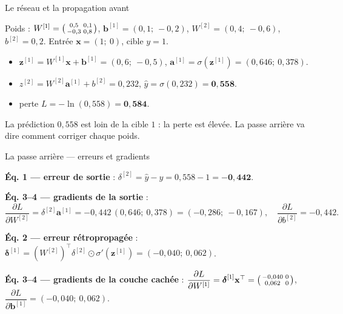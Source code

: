 \documentclass[aspectratio=169,11pt]{beamer}
\newcommand{\vx}{\mathbf{x}}
\newcommand{\va}{\mathbf{a}}
\newcommand{\vz}{\mathbf{z}}
\newcommand{\vb}{\mathbf{b}}
\newcommand{\vd}{\boldsymbol{\delta}}
\begin{document}
\begin{frame}{Le réseau et la propagation avant}
\begin{ucadex}
{\small Poids : $W^{[1]} = \begin{psmallmatrix} 0{,}5 & 0{,}1\\ -0{,}3 & 0{,}8 \end{psmallmatrix}$, $\vb^{[1]} = (0{,}1;\ -0{,}2)$, $W^{[2]} = (0{,}4;\ -0{,}6)$, $b^{[2]} = 0{,}2$. Entrée $\vx = (1;\ 0)$, cible $y = 1$.
\begin{itemize}
  \item $\vz^{[1]} = W^{[1]}\vx + \vb^{[1]} = (0{,}6;\ -0{,}5)$, \quad $\va^{[1]} = \sigma(\vz^{[1]}) = (0{,}646;\ 0{,}378)$.
  \item $z^{[2]} = W^{[2]}\va^{[1]} + b^{[2]} = 0{,}232$, \quad $\hat y = \sigma(0{,}232) = \mathbf{0{,}558}$.
  \item perte $L = -\ln(0{,}558) = \mathbf{0{,}584}$.
\end{itemize}
La prédiction $0{,}558$ est loin de la cible $1$ : la perte est élevée. La passe arrière va dire comment corriger chaque poids.}
\end{ucadex}
\end{frame}

\begin{frame}{La passe arrière — erreurs et gradients}
\begin{ucadex}
{\small \textbf{Éq. 1 — erreur de sortie} : $\delta^{[2]} = \hat y - y = 0{,}558 - 1 = \mathbf{-0{,}442}$.

\textbf{Éq. 3–4 — gradients de la sortie} :
\[ \frac{\partial L}{\partial W^{[2]}} = \delta^{[2]}\va^{[1]} = -0{,}442\,(0{,}646;\ 0{,}378) = (-0{,}286;\ -0{,}167), \quad \frac{\partial L}{\partial b^{[2]}} = -0{,}442. \]

\textbf{Éq. 2 — erreur rétropropagée} : $\vd^{[1]} = (W^{[2]})^\top \delta^{[2]} \odot \sigma'(\vz^{[1]}) = (-0{,}040;\ 0{,}062)$.

\textbf{Éq. 3–4 — gradients de la couche cachée} : $\dfrac{\partial L}{\partial W^{[1]}} = \vd^{[1]}\vx^\top = \begin{psmallmatrix} -0{,}040 & 0\\ 0{,}062 & 0 \end{psmallmatrix}$, $\dfrac{\partial L}{\partial \vb^{[1]}} = (-0{,}040;\ 0{,}062)$.}
\end{ucadex}
\end{frame}
\end{document}
